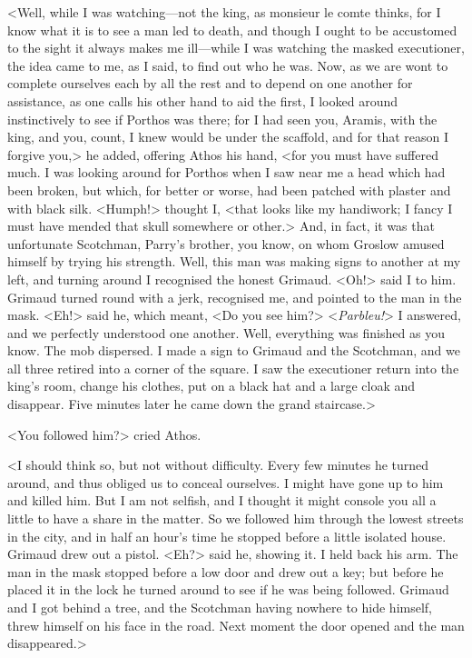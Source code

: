 <Well, while I was watching—not the king, as monsieur le comte thinks, for I know what it is to see a man led to death, and though I ought to be accustomed to the sight it always makes me ill—while I was watching the masked executioner, the idea came to me, as I said, to find out who he was. Now, as we are wont to complete ourselves each by all the rest and to depend on one another for assistance, as one calls his other hand to aid the first, I looked around instinctively to see if Porthos was there; for I had seen you, Aramis, with the king, and you, count, I knew would be under the scaffold, and for that reason I forgive you,> he added, offering Athos his hand, <for you must have suffered much. I was looking around for Porthos when I saw near me a head which had been broken, but which, for better or worse, had been patched with plaster and with black silk. <Humph!> thought I, <that looks like my handiwork; I fancy I must have mended that skull somewhere or other.> And, in fact, it was that unfortunate Scotchman, Parry's brother, you know, on whom Groslow amused himself by trying his strength. Well, this man was making signs to another at my left, and turning around I recognised the honest Grimaud. <Oh!> said I to him. Grimaud turned round with a jerk, recognised me, and pointed to the man in the mask. <Eh!> said he, which meant, <Do you see him?> <\textit{Parbleu!}> I answered, and we perfectly understood one another. Well, everything was finished as you know. The mob dispersed. I made a sign to Grimaud and the Scotchman, and we all three retired into a corner of the square. I saw the executioner return into the king's room, change his clothes, put on a black hat and a large cloak and disappear. Five minutes later he came down the grand staircase.>

<You followed him?> cried Athos.

<I should think so, but not without difficulty. Every few minutes he turned around, and thus obliged us to conceal ourselves. I might have gone up to him and killed him. But I am not selfish, and I thought it might console you all a little to have a share in the matter. So we followed him through the lowest streets in the city, and in half an hour's time he stopped before a little isolated house. Grimaud drew out a pistol. <Eh?> said he, showing it. I held back his arm. The man in the mask stopped before a low door and drew out a key; but before he placed it in the lock he turned around to see if he was being followed. Grimaud and I got behind a tree, and the Scotchman having nowhere to hide himself, threw himself on his face in the road. Next moment the door opened and the man disappeared.>

